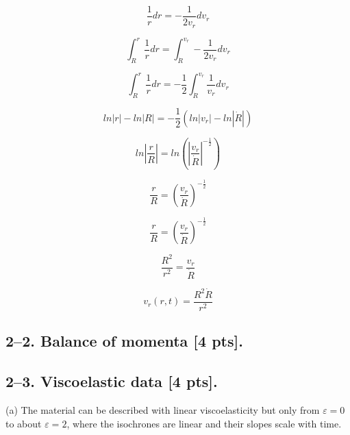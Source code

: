 \documentclass{article}
\begin{document}
\begin{equation*}
    \frac{1}{r}dr = -\frac{1}{2v_r}dv_r
\end{equation*}

\begin{equation*}
    \int_{R}^{r} \frac{1}{r}dr = \int_{\dot R}^{v_r} -\frac{1}{2v_r}dv_r
\end{equation*}

\begin{equation*}
    \int_{R}^{r} \frac{1}{r}dr = -\frac12 \int_{\dot R}^{v_r} \frac{1}{v_r}dv_r
\end{equation*}

\begin{equation*}
    ln|r| - ln|R| = -\frac12 (ln|v_r| - ln|\dot R|)
\end{equation*}

\begin{equation*}
    ln|\frac{r}{R}| = ln(|\frac{v_r}{\dot R}|^{-\frac12})
\end{equation*}

\begin{equation*}
    \frac{r}{R} = (\frac{v_r}{\dot R})^{-\frac12}
\end{equation*}

\begin{equation*}
    \frac{r}{R} = (\frac{v_r}{\dot R})^{-\frac12}
\end{equation*}

\begin{equation*}
    \frac{R^2}{r^2} = \frac{v_r}{\dot R}
\end{equation*}

\begin{equation*}
    v_r(r,t) = \frac{R^2 \dot R}{r^2}
\end{equation*}

\newpage


\subsection*{2--2. \textbf{Balance of momenta} [4 pts].}




\newpage


\subsection*{2--3. \textbf{Viscoelastic data} [4 pts].} 

(a) The material can be described with linear viscoelasticity but only from $\varepsilon = 0$ to about $\varepsilon = 2$, where the isochrones are linear and their slopes scale with time.
\end{document}
